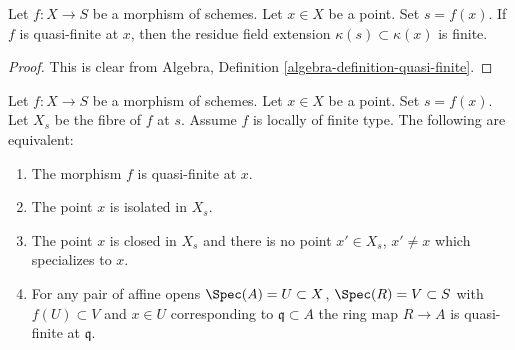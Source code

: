 \begin{lemma}
\label{lemma-residue-field-quasi-finite}
Let $f : X \to S$ be a morphism of schemes.
Let $x \in X$ be a point. Set $s = f(x)$.
If $f$ is quasi-finite at $x$, then the residue field
extension $\kappa(s) \subset \kappa(x)$ is finite.
\end{lemma}

\begin{proof}
This is clear from Algebra, Definition \ref{algebra-definition-quasi-finite}.
\end{proof}

\begin{lemma}
\label{lemma-quasi-finite-at-point-characterize}
Let $f : X \to S$ be a morphism of schemes.
Let $x \in X$ be a point. Set $s = f(x)$.
Let $X_s$ be the fibre of $f$ at $s$.
Assume $f$ is locally of finite type.
The following are equivalent:
\begin{enumerate}
\item The morphism $f$ is quasi-finite at $x$.
\item The point $x$ is isolated in $X_s$.
\item The point $x$ is closed in $X_s$
and there is no point $x' \in X_s$, $x' \not = x$
which specializes to $x$.
\item For any pair of affine opens
$\Spec(A) = U \subset X$, $\Spec(R) = V \subset S$ with
$f(U) \subset V$ and $x \in U$ corresponding to $\mathfrak q \subset A$
the ring map $R \to A$ is quasi-finite at $\mathfrak q$.
\end{enumerate}
\end{lemma}

